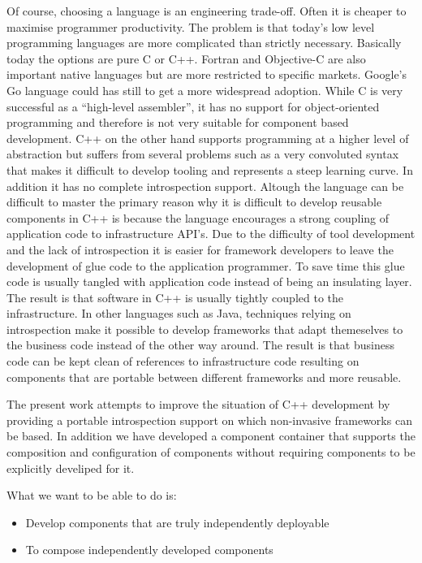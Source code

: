 Of course, choosing a language is an engineering trade-off. Often it is cheaper to maximise programmer
productivity. The problem is that today's low level programming languages are more complicated than
strictly necessary. Basically today the options are pure C or C++. Fortran and Objective-C are also
important native languages but are more restricted to specific markets. Google's Go language could
has still to get a more widespread adoption. While C is very successful as a ``high-level assembler'',
it has no support for object-oriented programming and therefore is not very suitable for component
based development. C++ on the other hand supports programming at a higher level of abstraction but
suffers from several problems such as a very convoluted syntax that makes it difficult to develop
tooling and represents a steep learning curve. In addition it has no complete introspection support.
Altough the language can be difficult to master the primary reason why it is difficult to develop
reusable components in C++ is because the language encourages a strong coupling of application code
to infrastructure API's. Due to the difficulty of tool development and the lack of introspection
it is easier for framework developers to leave the development of glue code to the application
programmer. To save time this glue code is usually tangled with application code instead of
being an insulating layer. The result is that software in C++ is usually tightly coupled to
the infrastructure. In other languages such as Java, techniques relying on introspection
make it possible to develop frameworks that adapt themeselves to the business code instead of
the other way around. The result is that business code can be kept clean of references to infrastructure
code resulting on components that are portable between different frameworks and more reusable.

The present work attempts to improve the situation of C++ development by providing a portable
introspection support on which non-invasive frameworks can be based. In addition we have developed
a component container that supports the composition and configuration of components without requiring
components to be explicitly develiped for it.

What we want to be able to do is:

\begin{itemize}
 \item Develop components that are truly independently deployable
 \item To compose independently developed components
\end{itemize}

